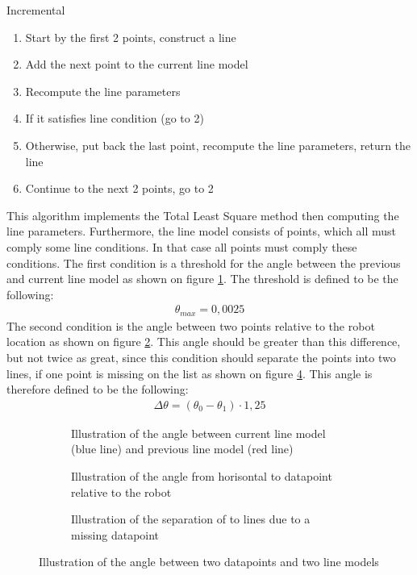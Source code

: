 \documentclass[../Head/Main.tex]{subfiles}
\begin{document}
\begin{Pseudo}{Incremental}{}
	\begin{enumerate}
		\item Start by the first 2 points, construct a 				line
		\item Add the next point to the current line model
		\item Recompute the line parameters
		\item If it satisfies line condition (go to 2)
		\item Otherwise, put back the last point, 					recompute the line parameters, return the line
		\item Continue to the next 2 points, go to 2
	\end{enumerate}
\end{Pseudo}
This algorithm implements the Total Least Square method then computing the line parameters. Furthermore, the line model consists of points, which all must comply some line conditions. In that case all points must comply these conditions. The first condition is a threshold for the angle between the previous and current line model as shown on figure \ref{fig:Line_model_angle}. The threshold is defined to be the following:
\begin{align*}
	\theta_{max} = 0,0025
\end{align*}
The second condition is the angle between two points relative to the robot location as shown on figure \ref{fig:Datapoints_angle}. This angle should be greater than this difference, but not twice as great, since this condition should separate the points into two lines, if one point is missing on the list as shown on figure \ref{fig:Line_separation}. This angle is therefore defined to be the following:
\begin{align*}
	\Delta\theta = \left(\theta_0 - \theta_1\right)\cdot 1,25
\end{align*}
\begin{figure}[H]
	\begin{subfigure}[b]{0.3\textwidth}
		\centering
		
		\caption{Illustration of the angle between current line model (blue line) and previous line model (red line)}
		\label{fig:Line_model_angle}
  	\end{subfigure}
  	\hfill
  	\begin{subfigure}[b]{0.3\textwidth}
  		\centering
		
		\caption{Illustration of the angle from horisontal to datapoint relative to the robot \\}
		\label{fig:Datapoints_angle}
	\end{subfigure}
	\hfill
	\begin{subfigure}[b]{0.3\textwidth}
  		\centering
		
		\caption{Illustration of the separation of to lines due to a missing datapoint \\}
		\label{fig:Line_separation}
	\end{subfigure}
  	\caption{Illustration of the angle between two datapoints and two line models}
\end{figure}
\end{document}
